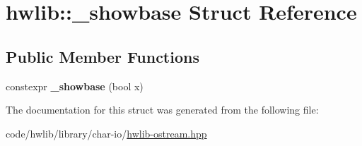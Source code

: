 \hypertarget{structhwlib_1_1__showbase}{}\section{hwlib\+:\+:\+\_\+showbase Struct Reference}
\label{structhwlib_1_1__showbase}
\subsection*{Public Member Functions}
\begin{DoxyCompactItemize}
\item 
\mbox{\label{structhwlib_1_1__showbase_aa9dd5a4b597e34ae374859798a7a3c2d}} 
constexpr {\bfseries \+\_\+showbase} (bool x)
\end{DoxyCompactItemize}


The documentation for this struct was generated from the following file\+:\begin{DoxyCompactItemize}
\item 
code/hwlib/library/char-\/io/\hyperlink{hwlib-ostream_8hpp}{hwlib-\/ostream.\+hpp}\end{DoxyCompactItemize}

